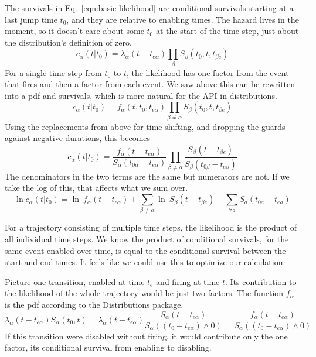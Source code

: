 \documentclass{article}
\begin{document}
The survivals in Eq.~\ref{eqn:basic-likelihood} are conditional survivals starting at a last jump time $t_0$, and they are relative to enabling times. The hazard lives in the moment, so it doesn't care about some $t_0$ at the start of the time step, just about the distribution's definition of zero.
\begin{equation}
	c_{\alpha}(t|t_0) = \lambda_{\alpha}(t-t_{e\alpha})\prod_\beta S_{\beta}(t_0,t, t_{\beta e})\label{eqn:core-with-enabling}
\end{equation}
For a single time step from $t_0$ to $t$, the likelihood has one factor from the event that fires and then a factor from each event.
We saw above this can be rewritten into a pdf and survivals, which is more natural for the API in distributions.
\begin{equation}
	c_{\alpha}(t|t_0) = f_{\alpha}(t,t_0,t_{e\alpha})\prod_{\beta\ne\alpha} S_{\beta}(t_0,t, t_{\beta e})
\end{equation}
Using the replacements from above for time-shifting, and dropping the guards against negative durations, this becomes
\begin{equation}
	c_{\alpha}(t|t_0) = \frac{f_{\alpha}(t-t_{e\alpha})}{S_\alpha(t_{0\alpha}-t_{e\alpha})}\prod_{\beta\ne\alpha} \frac{S_{\beta}(t - t_{\beta e})}{S_\beta(t_{0\beta}-t_{e\beta})}
\end{equation}
The denominators in the two terms are the same but numerators are not. If we take the log of this, that affects what we sum over.
\begin{equation}
\ln c_{\alpha}(t|t_0) = \ln\:f_{\alpha}(t-t_{e\alpha})+\sum_{\beta\ne\alpha}\ln\:S_{\beta}(t - t_{\beta e}) - \sum_{\forall a}S_a(t_{0a}-t_{ea})
\end{equation}


For a trajectory consisting of multiple time steps, the likelihood is the product of all individual time steps. We know the product of conditional survivals, for the same event enabled over time, is equal to the conditional survival between the start and end times. It feels like we could use this to optimize our calculation.

Picture one transition, enabled at time $t_e$ and firing at time $t$. Its contribution to the likelihood of the whole trajectory would be just two factors. The function $f_\alpha$ is the pdf according to the Distributions package.
\begin{equation}
	\lambda_{\alpha}(t-t_{e\alpha})S_{\alpha}(t_0,t)
	=\lambda_{\alpha}(t-t_{e\alpha})\frac{S_{\alpha}(t-t_{e\alpha})}{S_{\alpha}((t_0-t_{e\alpha})\wedge 0)}
	=\frac{f_{\alpha}(t-t_{e\alpha})}{S_{\alpha}((t_0-t_{e\alpha})\wedge 0)}\label{eqn:event-lifetime-likelihood}
\end{equation}
If this transition were disabled without firing, it would contribute only the one factor, its conditional survival from enabling to disabling.
\end{document}
